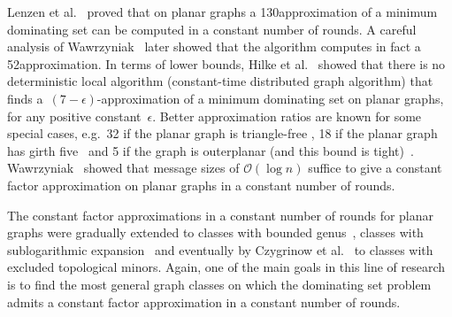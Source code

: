 Lenzen et al.~\cite{lenzen2013distributed} proved that on planar graphs
a 130\hspace{1pt}\raisebox{0.3pt}{-}\hspace{0.9pt}approximation of a minimum dominating set can be computed in a
constant number of
rounds. A careful analysis of Wawrzyniak~\cite{wawrzyniak2014strengthened}
later showed that the algorithm computes in fact a 52\hspace{1pt}\raisebox{0.3pt}{-}\hspace{0.9pt}approximation.
In terms of lower bounds, Hilke et al.~\cite{hilke2014brief} showed that there is no
deterministic local algorithm (constant-time distributed graph algorithm) that
finds a~$(7-\epsilon)$-approximation of a minimum dominating set on
planar graphs, for any positive constant~$\epsilon$. Better approximation
ratios are known for some special cases, e.g.\ 32 if the planar graph is
triangle-free \mbox{\cite[Theorem 2.1]{alipour2020distributed}}, 18 if the planar graph has girth
five~\cite{alipour2020local} and 5 if the graph is
outerplanar (and this bound is tight)~\cite[Theorem 1]{bonamy2021tight}.
Wawrzyniak~\cite{wawrzyniak2013brief} showed
that message sizes of $\mathcal{O}(\log n)$ suffice to give a
constant factor approximation on planar graphs in a constant number
of rounds.

The constant factor approximations in a constant number of rounds for planar
graphs were gradually extended to classes with bounded genus~\cite{akhoondian2016local,amiri2016brief}, classes with sublogarithmic expansion~\cite{amiri2019distributed} and eventually by Czygrinow et al.~\cite{czygrinow2018distributed} to classes with excluded topological minors.
Again, one of the main goals in this line of research is to find the most general
graph classes on which the dominating set problem admits a constant
factor approximation in a constant number of rounds.

\medskip

